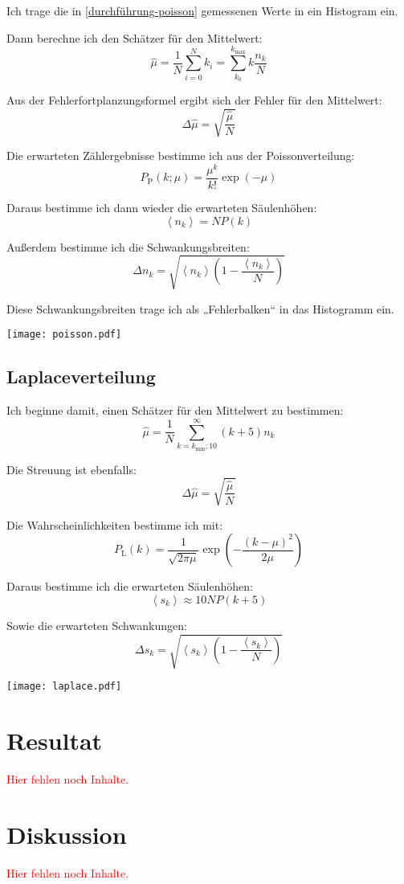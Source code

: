 \documentclass[11pt]{article}
\newcommand{\fehlt}{\textcolor{red}{Hier fehlen noch Inhalte.}}
\begin{document}
Ich trage die in \ref{durchführung-poisson} gemessenen Werte in ein Histogram ein.

Dann berechne ich den Schätzer für den Mittelwert:
\[ \hat \mu = \frac 1N \sum_{i=0}^N k_i = \sum_{k_0}^{k_\mathrm{max}} k \frac{n_k}{N} \]

Aus der Fehlerfortplanzungsformel ergibt sich der Fehler für den Mittelwert:
\[ \Delta \hat \mu = \sqrt{\frac{\hat \mu}N} \]

Die erwarteten Zählergebnisse bestimme ich aus der Poissonverteilung:
\[ P_\mathrm{P}(k;\mu) = \frac{\mu^k}{k!} \exp(-\mu) \]

Daraus bestimme ich dann wieder die erwarteten Säulenhöhen:
\[ \left\langle n_k \right\rangle = N P(k) \]

Außerdem bestimme ich die Schwankungsbreiten:
\[ \Delta n_k = \sqrt{\left\langle n_k \right\rangle \left( 1 - \frac{\left\langle n_k \right\rangle}N \right)} \]

Diese Schwankungsbreiten trage ich als „Fehlerbalken“ in das Histogramm ein.

\texttt{[image: poisson.pdf]}

\subsection{Laplaceverteilung}

Ich beginne damit, einen Schätzer für den Mittelwert zu bestimmen:
\[ \hat \mu = \frac 1N \sum_{k=k_\mathrm{min};10}^\infty (k+5) n_k \]

Die Streuung ist ebenfalls:
\[ \Delta \hat \mu = \sqrt{\frac{\hat \mu}N} \]

Die Wahrscheinlichkeiten bestimme ich mit:
\[ P_\mathrm{L}(k) = \frac 1{\sqrt{2 \pi \mu}} \exp\left(-\frac{(k-\mu)^2}{2\mu} \right) \]

Daraus bestimme ich die erwarteten Säulenhöhen:
\[ \left\langle s_k \right\rangle \approx 10 N P(k+5) \]

Sowie die erwarteten Schwankungen:
\[ \Delta s_k = \sqrt{\left\langle s_k \right\rangle \left( 1 - \frac{\left\langle s_k \right\rangle}N \right)} \]

\texttt{[image: laplace.pdf]}

\section{Resultat}

\fehlt

\section{Diskussion}

\fehlt
\end{document}
